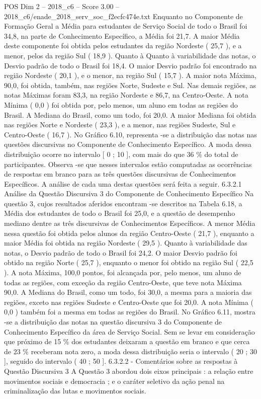 \begin{textsample}{POS Dim 2 – 2018\_c6 – Score 3.00 – 2018\_c6/enade\_2018\_serv\_soc\_f2ecfc474e.txt}
Enquanto no Componente de Formação Geral a Média para estudantes de Serviço Social de todo o Brasil foi 34,8, na parte de Conhecimento Específico, a Média foi 21,7.
A maior Média deste componente foi obtida pelos estudantes da região Nordeste ( 25,7 ), e a menor, pelos da região Sul ( 18,9 ).
Quanto à Quanto à variabilidade das notas, o Desvio padrão de todo o Brasil foi 18,4.
O maior Desvio padrão foi encontrado na região Nordeste ( 20,1 ), e o menor, na região Sul ( 15,7 ).
A maior nota Máxima, 90,0, foi obtida, também, nas regiões Norte, Sudeste e Sul.
Nas demais regiões, as notas Máximas foram 83,3, na região Nordeste e 86,7, na Centro-Oeste.
A nota Mínima ( 0,0 ) foi obtida por, pelo menos, um aluno em todas as regiões do Brasil.
A Mediana do Brasil, como um todo, foi 20,0.
A maior Mediana foi obtida nas regiões Norte e Nordeste ( 23,3 ), e a menor, nas regiões Sudeste, Sul e Centro-Oeste ( 16,7 ).
No Gráfico 6.10, representa -se a distribuição das notas nas questões discursivas no Componente de Conhecimento Específico.
A moda dessa distribuição ocorre no intervalo [ 0 ; 10 ], com mais do que 36 \% do total de participantes.
Observa -se que nesses intervalos estão computadas as ocorrências de respostas em branco para as três questões discursivas de Conhecimentos Específicos.
A análise de cada uma destas questões será feita a seguir. 6.3.2.1 Análise da Questão Discursiva 3 do Componente de Conhecimento Específico Na questão 3, cujos resultados aferidos encontram -se descritos na Tabela 6.18, a Média dos estudantes de todo o Brasil foi 25,0, e a questão de desempenho mediano dentre as três discursivas de Conhecimentos Específicos.
A menor Média nessa questão foi obtida pelos alunos da região Centro-Oeste ( 21,7 ), enquanto a maior Média foi obtida na região Nordeste ( 29,5 ).
Quanto à variabilidade das notas, o Desvio padrão de todo o Brasil foi 24,2.
O maior Desvio padrão foi obtido na região Norte ( 25,7 ), enquanto o menor foi obtido na região Sul ( 22,5 ).
A nota Máxima, 100,0 pontos, foi alcançada por, pelo menos, um aluno de todas as regiões, com exceção da região Centro-Oeste, que teve nota Máxima 90,0.
A Mediana do Brasil, como um todo, foi 30,0, a mesma para a maioria das regiões, exceto nas regiões Sudeste e Centro-Oeste que foi 20,0.
A nota Mínima ( 0,0 ) também foi a mesma em todas as regiões do Brasil.
No Gráfico 6.11, mostra -se a distribuição das notas na questão discursiva 3 do Componente de Conhecimento Específico da área de Serviço Social.
Sem se levar em consideração que próximo de 15 \% dos estudantes deixaram a questão em branco e que cerca de 23 \% receberam nota zero, a moda dessa distribuição seria o intervalo ( 20 ; 30 ], seguido do intervalo ( 40 ; 50 ]. 6.3.2.2 - Comentários sobre as respostas à Questão Discursiva 3 A Questão 3 abordou dois eixos principais : a relação entre movimentos sociais e democracia ; e o caráter seletivo da ação penal na criminalização das lutas e movimentos sociais.

\end{textsample}
